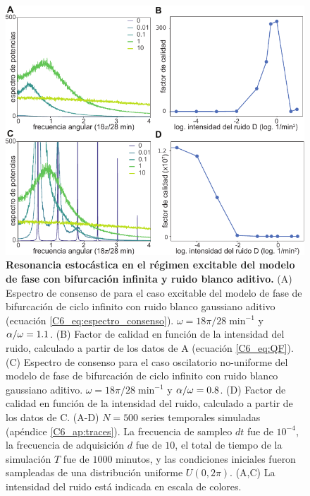 \documentclass[./main.tex]{subfiles}
\begin{document}
 \begin{figure}
    \centering
    \includegraphics[width=1\columnwidth]{figures/chapter6/C6_SR.pdf} 
    \caption{\textbf{Resonancia estocástica en el régimen excitable del modelo de fase con bifurcación infinita y ruido blanco aditivo.} (A) Espectro de consenso de para el caso excitable del modelo de fase de bifurcación de ciclo infinito con ruido blanco gaussiano aditivo (ecuación \ref{C6_eq:espectro_consenso}). $\omega = 18\pi/28 \; \text{min}^{-1}$ y $\alpha/\omega = 1.1$. (B) Factor de calidad en función de la intensidad del ruido, calculado a partir de los datos de A (ecuación \ref{C6_eq:QF}). (C) Espectro de consenso para el caso oscilatorio no-uniforme del modelo de fase de bifurcación de ciclo infinito con ruido blanco gaussiano aditivo. $\omega = 18\pi/28 \; \text{min}^{-1}$ y $\alpha/\omega = 0.8$. (D) Factor de calidad en función de la intensidad del ruido, calculado a partir de los datos de C. (A-D)  $N=500$ series temporales simuladas (apéndice \ref{C6_ap:traces}). La frecuencia de sampleo $dt$ fue de $10^{-4}$, la frecuencia de adquisición $d$ fue de $10$, el total de tiempo de la simulación $T$ fue de $1000$ minutos, y las condiciones iniciales fueron sampleadas de una distribución uniforme $U(0,2\pi)$. (A,C) La intensidad del ruido está indicada en escala de colores.}
    \label{C6_fig:SR}
\end{figure}
\end{document}
